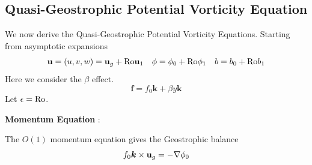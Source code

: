 \documentclass[../SQG_notes.tex]{subfiles}
\begin{document}
    \subsection{Quasi-Geostrophic Potential Vorticity Equation}
    We now derive the Quasi-Geostrophic Potential Vorticity Equations. Starting from asymptotic expansions 
    \[ \mathbf{u} = (u, v, w) = \mathbf{u}_g + \text{Ro} \mathbf{u}_1 \quad \phi = \phi_0 + \text{Ro} \phi_1 \quad b = b_0 + \text{Ro} b_1\]
    Here we consider the $\beta$ effect. 
    \[ \mathbf{f} = f_0 \bm{k} + \beta y \bm{k}\]
    Let $\epsilon = \text{Ro}$. \par
    \textbf{Momentum Equation} : \par
    The $O(1)$ momentum equation gives the Geostrophic balance
    \begin{equation}
        f_0 \bm{k} \times \mathbf{u}_g = -\nabla \phi_0 \label{Geostrophic balance equation}
    \end{equation}
    
\end{document}
